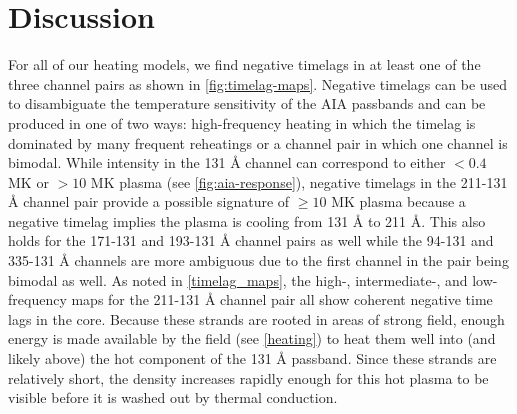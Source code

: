 
\section{Discussion}\label{discussion}

For all of our heating models, we find negative timelags in at least one of the three channel pairs as shown in \autoref{fig:timelag-maps}. Negative timelags can be used to disambiguate the temperature sensitivity of the AIA passbands and can be produced in one of two ways: high-frequency heating in which the timelag is dominated by many frequent reheatings or a channel pair in which one channel is bimodal. While intensity in the 131 \AA{} channel can correspond to either $<0.4$ MK or $>10$ MK plasma (see \autoref{fig:aia-response}), negative timelags in the 211-131 \AA{} channel pair provide a possible signature of $\ge10$ MK plasma because a negative timelag implies the plasma is cooling from 131 \AA{} to 211 \AA{}. This also holds for the 171-131 and 193-131 \AA{} channel pairs as well while the 94-131 and 335-131 \AA{} channels are more ambiguous due to the first channel in the pair being bimodal as well. As noted in \autoref{timelag_maps}, the high-, intermediate-, and low-frequency maps for the 211-131 \AA{} channel pair all show coherent negative time lags in the core. Because these strands are rooted in areas of strong field, enough energy is made available by the field (see \autoref{heating}) to heat them well into (and likely above) the hot component of the 131 \AA{} passband. Since these strands are relatively short, the density increases rapidly enough for this hot plasma to be visible before it is washed out by thermal conduction.

